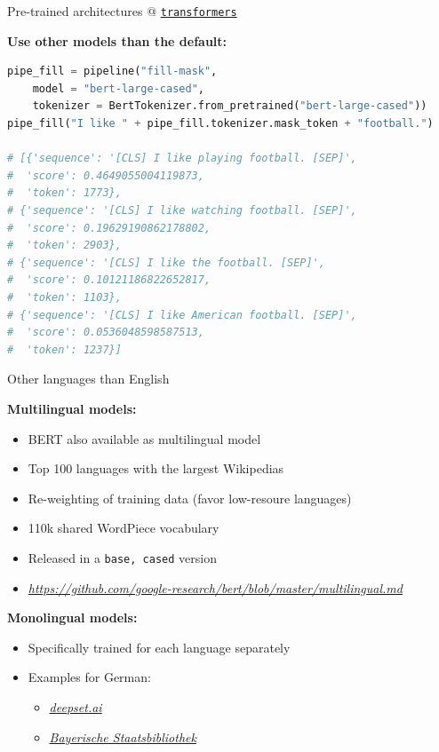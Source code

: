\documentclass[]{beamer}
\begin{document}
\begin{frame}[fragile]{Pre-trained architectures @ \href{https://github.com/huggingface/transformers}{\texttt{transformers}}}

\textbf{Use other models than the default:}
\vspace{-.2cm}
\begin{lstlisting}[language=Python]
pipe_fill = pipeline("fill-mask", 
    model = "bert-large-cased", 
    tokenizer = BertTokenizer.from_pretrained("bert-large-cased"))
pipe_fill("I like " + pipe_fill.tokenizer.mask_token + "football.")

# [{'sequence': '[CLS] I like playing football. [SEP]',
#  'score': 0.4649055004119873,
#  'token': 1773},
# {'sequence': '[CLS] I like watching football. [SEP]',
#  'score': 0.19629190862178802,
#  'token': 2903},
# {'sequence': '[CLS] I like the football. [SEP]',
#  'score': 0.10121186822652817,
#  'token': 1103},
# {'sequence': '[CLS] I like American football. [SEP]',
#  'score': 0.0536048598587513,
#  'token': 1237}]
\end{lstlisting}
\end{frame}


\begin{frame}[fragile]{Other languages than English}

\textbf{Multilingual models:}

\begin{itemize}
		\item BERT also available as multilingual model
		\item Top 100 languages with the largest Wikipedias
		\item Re-weighting of training data (favor low-resoure languages)
		\item 110k shared WordPiece vocabulary
		\item Released in a \texttt{base, cased} version
		\item \footnotesize\href{https://github.com/google-research/bert/blob/master/multilingual.md}{\textit{https://github.com/google-research/bert/blob/master/multilingual.md}}\normalsize
\end{itemize}

\vspace{.3cm}

\textbf{Monolingual models:}

\begin{itemize}
	\item Specifically trained for each language separately
	\item Examples for German:
		\begin{itemize}
			\item \href{https://deepset.ai/german-bert}{\textit{deepset.ai}}
			\item \href{https://huggingface.co/dbmdz/bert-base-german-cased}{\textit{Bayerische Staatsbibliothek}}
		\end{itemize}
\end{itemize}
\end{frame}
\end{document}
